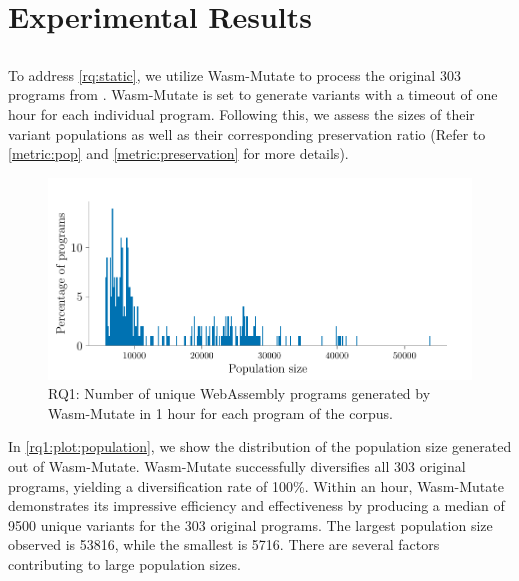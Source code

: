 \documentclass[a4paper,fleqn]{cas-dc}
\newcommand{\tool}{{\sc Wasm-Mutate}\xspace}
\newcommand{\Wasm}{WebAssembly\xspace}
\newcommand{\wasm}{\Wasm}
\begin{document}
\section{Experimental Results}
\label{results}

\subsection{\rqstatic}
\label{rq:static:results}

\newcommand{\preserved}{62\%\xspace}

To address \ref{rq:static}, we utilize \tool to process the original 303 programs from \cite{arteaga2020crow}. 
\tool is set to generate variants with a timeout of one hour for each individual program. 
Following this, we assess the sizes of their variant populations as well as their corresponding preservation ratio (Refer to \autoref{metric:pop} and \autoref{metric:preservation} for more details).

\begin{figure}
    \centering
    \includegraphics[width=\linewidth]{plots/rq1/population.pdf}
    \caption{RQ1: Number of unique \wasm programs generated by \tool in 1 hour for each program of the corpus.}
  \label{rq1:plot:population}
\end{figure}


In \autoref{rq1:plot:population}, we show the distribution of the population size generated out of \tool.
\tool successfully diversifies all 303 original programs, yielding a diversification rate of 100\%. 
Within an hour, \tool demonstrates its impressive efficiency and effectiveness by producing a median of 9500 unique variants for the 303 original programs.
The largest population size observed is 53816, while the smallest is 5716.
There are several factors contributing to large population sizes. 
\end{document}
